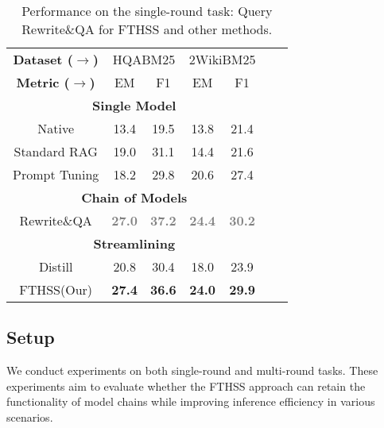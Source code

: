 \begin{table*}[t]
\begin{minipage}{0.465\textwidth}
{\begin{tabular}{ccccccc}
            \textbf{Dataset (\(\rightarrow\))} & \multicolumn{2}{c}{HQABM25} & \multicolumn{2}{c}{2WikiBM25} \\

            \textbf{Metric (\(\rightarrow\))} & EM & F1 & EM & F1 \\
            \midrule

            \multicolumn{5}{c}{\textbf{Single Model}} \\
            Native  & 13.4 & 19.5 & 13.8 & 21.4 \\
            Standard RAG  & 19.0 & 31.1 & 14.4 & 21.6\\
            Prompt Tuning  & 18.2 & 29.8 & 20.6 & 27.4 \\

            \midrule
            \multicolumn{5}{c}{\textbf{Chain of Models}} \\
            Rewrite\&QA & \textcolor{gray}{\textbf{27.0}} & \textcolor{gray}{\textbf{37.2}} & \textcolor{gray}{\textbf{24.4}} & \textcolor{gray}{\textbf{30.2}} \\        
            \midrule 

            \multicolumn{5}{c}{\textbf{Streamlining}} \\
            Distill  & 20.8 & 30.4 & 18.0 & 23.9 \\
            FTHSS(Our)  & \textbf{27.4} & \textbf{36.6}& \textbf{24.0} & \textbf{29.9} \\
            \bottomrule
        \end{tabular}
        }
        \caption{
            Performance on the single-round task: Query Rewrite\&QA for FTHSS and other methods.
        }
        \label{tab:rewrite_performance}
    \end{minipage}
\end{table*}



\subsection{Setup}

We conduct experiments on both single-round and multi-round tasks. These experiments aim to evaluate whether the FTHSS approach can retain the functionality of model chains while improving inference efficiency in various scenarios.

